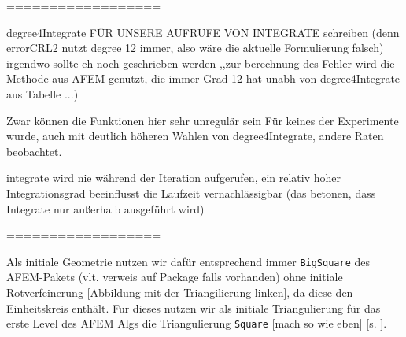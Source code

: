 ==================

degree4Integrate FÜR UNSERE AUFRUFE VON INTEGRATE schreiben (denn errorCRL2
nutzt degree 12 immer, also wäre die aktuelle Formulierung falsch)
irgendwo sollte eh noch geschrieben werden ,,zur berechnung des Fehler wird
die Methode aus AFEM genutzt, die immer Grad 12 hat unabh von degree4Integrate
aus Tabelle ...)

Zwar können die Funktionen hier sehr unregulär sein
Für keines der Experimente wurde, auch mit deutlich höheren Wahlen von
degree4Integrate, andere Raten beobachtet.

integrate wird nie während der Iteration aufgerufen, ein relativ hoher 
Integrationsgrad beeinflusst die Laufzeit vernachlässigbar (das betonen,
dass Integrate nur außerhalb ausgeführt wird)

==================

Als initiale Geometrie nutzen wir dafür entsprechend immer
\texttt{BigSquare} des AFEM-Pakets (vlt. verweis auf Package falls vorhanden)
ohne initiale Rotverfeinerung [Abbildung mit der Triangilierung linken], da
diese den Einheitskreis enthält.
Fur dieses nutzen wir als initiale
Triangulierung für das erste Level des AFEM Algs die Triangulierung
\texttt{Square} [mach so wie eben] [s. ].

